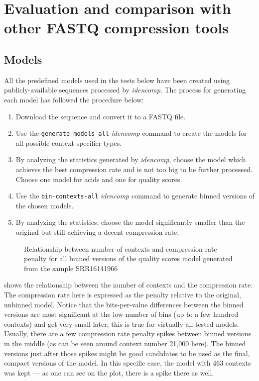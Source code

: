 \section{Evaluation and comparison with other FASTQ compression tools}\label
{sec:evaluation-and-comparison-with-other-fastq-compression-tools}

\subsection{Models}\label{subsec:models}

All the predefined models used in the tests below have been created using
publicly-available sequences processed by \emph{idencomp}.
The process for generating each model has followed the procedure below:

\begin{enumerate}
    \item Download the sequence and convert it to a FASTQ file.
    \item Use the \texttt{generate-models-all} \emph{idencomp} command to
    create the models for all possible context specifier types.
    \item By analyzing the statistics generated by \emph{idencomp}, choose
    the model which achieves the best compression rate and is not too big to
    be further processed.
    Choose one model for acids and one for quality scores.
    \item Use the \texttt{bin-contexts-all} \emph{idencomp} command to
    generate binned versions of the chosen models.
    \item By analyzing the statistics, choose the model significantly smaller
    than the original but still achieving a decent compression rate.
\end{enumerate}

\begin{figure}[h]
    \centering
    
    \caption{Relationship between number of contexts and compression rate
    penalty for all binned versions of the quality scores model generated
    from the sample SRR16141966}
    \label{fig:binning-example}
\end{figure}

 shows the relationship between the number of
contexts and the compression rate.
The compression rate here is expressed as the penalty relative to the
original, unbinned model.
Notice that the bits-per-value differences between the binned versions are
most significant at the low number of bins (up to a few hundred contexts) and
get very small later;
this is true for virtually all tested models.
Usually, there are a few compression rate penalty spikes between binned
versions in the middle (as can be seen around context number 21,000 here).
The binned versions just after those spikes might be good candidates to be
used as the final, compact versions of the model.
In this specific case, the model with 463 contexts was kept --- as one can
see on the plot, there is a spike there as well.

